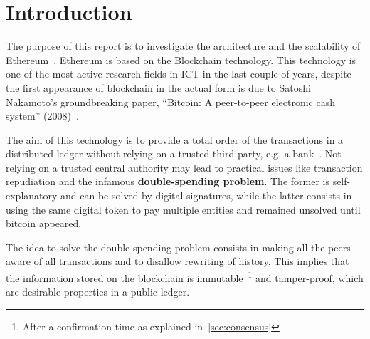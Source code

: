 \section*{Introduction}

The purpose of this report is to investigate the architecture and the 
scalability of Ethereum~\cite{wood2018ethereum}. Ethereum is based on the 
Blockchain technology. This technology is one of the most active research
fields in ICT in the last couple of years, despite the first appearance of
blockchain in the actual form is due to Satoshi Nakamoto's groundbreaking 
paper, ``Bitcoin: A peer-to-peer electronic cash system''
(2008)~\cite{bib:bitcoin}. 

The aim of this technology is to provide a total order of the 
transactions in a distributed ledger without relying on a trusted third party, 
e.g. a bank~\cite{bib:the-quest}. Not relying on a trusted central authority
may lead to practical issues like transaction repudiation and the infamous 
\textbf{double-spending problem}. The former is self-explanatory and can
be solved by digital signatures, while the latter consists in using the same
digital token to pay multiple entities and remained unsolved until bitcoin 
appeared. 

The idea to solve the double spending problem consists in making all the peers
aware of all transactions and to disallow rewriting of history. This implies
that the information stored on the blockchain is immutable~\footnote{After a 
confirmation time as explained in~\autoref{sec:consensus}} and tamper-proof,
which are desirable properties in a public ledger.